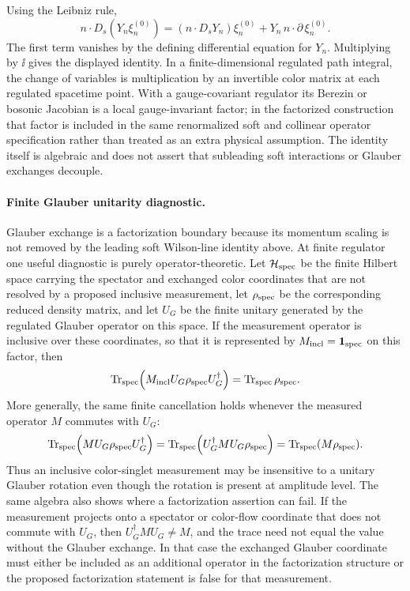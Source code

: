 Using the Leibniz rule,
\[
  n\cdot D_s(Y_n\xi_n^{(0)})
  =
  (n\cdot D_sY_n)\xi_n^{(0)}
  +Y_n\,n\cdot\partial\,\xi_n^{(0)} .
\]
The first term vanishes by the defining differential equation for \(Y_n\).
Multiplying by \(\ii\) gives the displayed identity.  In a finite-dimensional
regulated path integral, the change of variables is multiplication by an
invertible color matrix at each regulated spacetime point.  With a
gauge-covariant regulator its Berezin or bosonic Jacobian is a local
gauge-invariant factor; in the factorized construction that factor is included
in the same renormalized soft and collinear operator specification rather than treated
as an extra physical assumption.  The identity itself is algebraic and does
not assert that subleading soft interactions or Glauber exchanges decouple.

\paragraph{Finite Glauber unitarity diagnostic.}
Glauber exchange is a factorization boundary because its momentum scaling is
not removed by the leading soft Wilson-line identity above.  At finite
regulator one useful diagnostic is purely operator-theoretic.  Let
\(\mathcal H_{\rm spec}\) be the finite Hilbert space carrying the spectator
and exchanged color coordinates that are not resolved by a proposed
inclusive measurement, let \(\rho_{\rm spec}\) be the corresponding reduced
density matrix, and let \(U_G\) be the finite unitary generated by the
regulated Glauber operator on this space.  If the measurement operator is
inclusive over these coordinates, so that it is represented by
\(M_{\rm incl}=\mathbf 1_{\rm spec}\) on this factor, then
\begin{equation}
  \operatorname{Tr}_{\rm spec}
  \!\left(M_{\rm incl}U_G\rho_{\rm spec}U_G^\dagger\right)
  =
  \operatorname{Tr}_{\rm spec}\rho_{\rm spec}.
  \label{eq:glauber-inclusive-unitarity-diagnostic}
\end{equation}
More generally, the same finite cancellation holds whenever the measured
operator \(M\) commutes with \(U_G\):
\begin{equation}
  \operatorname{Tr}_{\rm spec}\!\left(MU_G\rho_{\rm spec}U_G^\dagger\right)
  =
  \operatorname{Tr}_{\rm spec}\!\left(U_G^\dagger M U_G\rho_{\rm spec}\right)
  =
  \operatorname{Tr}_{\rm spec}(M\rho_{\rm spec}).
  \label{eq:glauber-commuting-measurement-diagnostic}
\end{equation}
Thus an inclusive color-singlet measurement may be insensitive to a unitary
Glauber rotation even though the rotation is present at amplitude level.  The
same algebra also shows where a factorization assertion can fail.  If the
measurement projects onto a spectator or color-flow coordinate that does not
commute with \(U_G\), then \(U_G^\dagger M U_G\neq M\), and the trace need not
equal the value without the Glauber exchange.  In that case the exchanged
Glauber coordinate must either be included as an additional operator in the
factorization structure or the proposed factorization statement is false for that
measurement.

